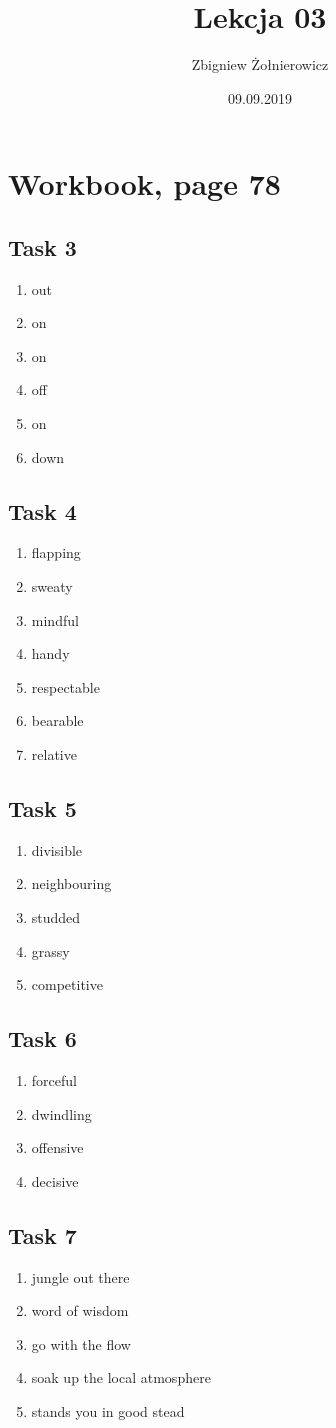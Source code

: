 \documentclass[a4paper]{article}
\begin{document}
\title{{\huge Lekcja 03} \\
{\large }}
\author{Zbigniew Żołnierowicz}
\date{09.09.2019}
\maketitle
\section*{Workbook, page 78}
\subsection*{Task 3}
\begin{enumerate}
    \item out
    \item on
    \item on
    \item off
    \item on
    \item down
\end{enumerate}
\subsection*{Task 4}
\begin{enumerate}
    \item flapping
    \item sweaty
    \item mindful
    \item handy
    \item respectable
    \item bearable
    \item relative
\end{enumerate}
\subsection*{Task 5}
\begin{enumerate}
    \item divisible
    \item neighbouring
    \item studded
    \item grassy
    \item competitive
\end{enumerate}
\subsection*{Task 6}
\begin{enumerate}
    \item forceful
    \item dwindling
    \item offensive
    \item decisive
\end{enumerate}
\subsection*{Task 7}
\begin{enumerate}
    \item jungle out there
    \item word of wisdom
    \item go with the flow
    \item soak up the local atmosphere
    \item stands you in good stead
\end{enumerate}
\end{document}
